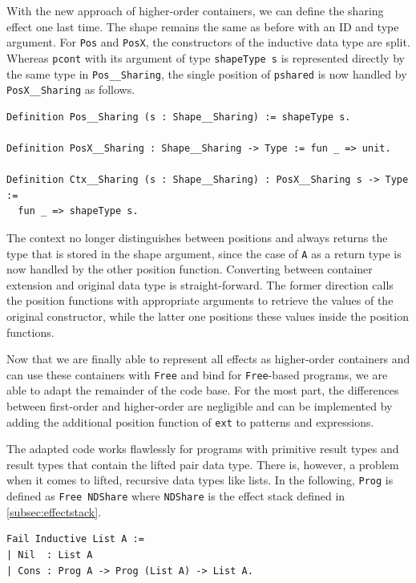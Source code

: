 \documentclass[a4paper, 11pt, fleqn, twoside, abstract=on]{scrreprt}
\newcommand{\cinl}[1]{\texttt{#1}}
\begin{document}
With the new approach of higher-order containers, we can define the sharing effect one last time.
The shape remains the same as before with an ID and type argument.
For \cinl{Pos} and \cinl{PosX}, the constructors of the inductive data type are split.
Whereas \cinl{pcont} with its argument of type \cinl{shapeType s} is represented directly by the same type in \cinl{Pos__Sharing}, the single position of \cinl{pshared} is now handled by \cinl{PosX__Sharing} as follows.

\begin{verbatim}
Definition Pos__Sharing (s : Shape__Sharing) := shapeType s.

Definition PosX__Sharing : Shape__Sharing -> Type := fun _ => unit.

Definition Ctx__Sharing (s : Shape__Sharing) : PosX__Sharing s -> Type :=
  fun _ => shapeType s.
\end{verbatim}

The context no longer distinguishes between positions and always returns the type that is stored in the shape argument, since the case of \cinl{A} as a return type is now handled by the other position function.
Converting between container extension and original data type is straight-forward.
The former direction calls the position functions with appropriate arguments to retrieve the values of the original constructor, while the latter one positions these values inside the position functions.

Now that we are finally able to represent all effects as higher-order containers and can use these containers with \cinl{Free} and bind for \cinl{Free}-based programs, we are able to adapt the remainder of the code base.
For the most part, the differences between first-order and higher-order are negligible and can be implemented by adding the additional position function of \cinl{ext} to patterns and expressions.

The adapted code works flawlessly for programs with primitive result types and result types that contain the lifted pair data type.
There is, however, a problem when it comes to lifted, recursive data types like lists.
In the following, \cinl{Prog} is defined as \cinl{Free NDShare} where \cinl{NDShare} is the effect stack defined in \autoref{subsec:effectstack}.

\begin{verbatim}
Fail Inductive List A :=
| Nil  : List A
| Cons : Prog A -> Prog (List A) -> List A.
\end{verbatim}
\end{document}

